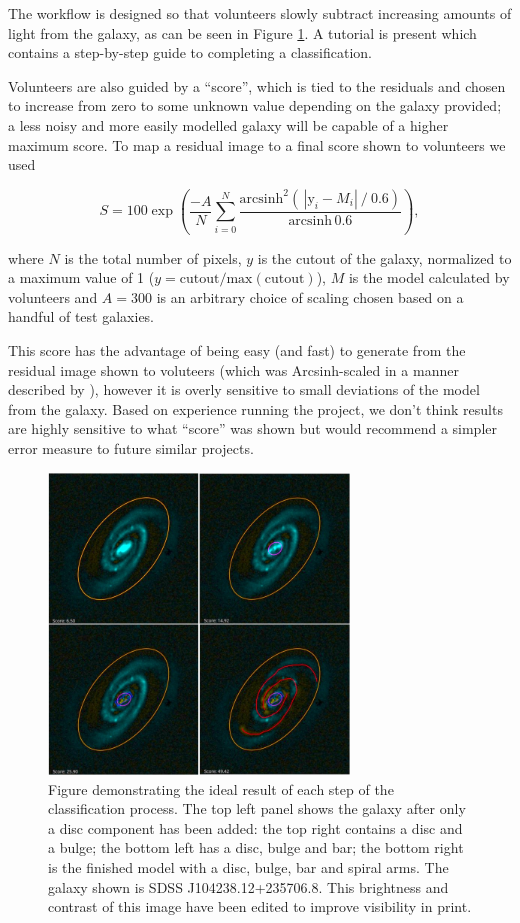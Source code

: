 \documentclass[../main.tex]{subfiles}
\begin{document}
The workflow is designed so that volunteers slowly subtract increasing amounts of light from the galaxy, as can be seen in Figure \ref{fig:residualsStepByStep}. A tutorial is present which contains a step-by-step guide to completing a classification.

Volunteers are also guided by a ``score'', which is tied to the residuals and chosen to increase from zero to some unknown value depending on the galaxy provided; a less noisy and more easily modelled galaxy will be capable of a higher maximum score. To map a residual image to a final score shown to volunteers we used

\begin{equation*}
    S = 100 \exp\left(\frac{-A}{N}\sum_{i=0}^N\frac{\text{arcsinh}^2\left(\,|\text{y}_i - M_i|\ /\ 0.6\right)}{\text{arcsinh}\,0.6 }\right),
\end{equation*}

where $N$ is the total number of pixels, $y$ is the cutout of the galaxy, normalized to a maximum value of 1 ($y = \text{cutout}/\text{max}(\text{cutout})$), $M$ is the model calculated by volunteers and $A=300$ is an arbitrary choice of scaling chosen based on a handful of test galaxies.

This score has the advantage of being easy (and fast) to generate from the residual image shown to voluteers (which was Arcsinh-scaled in a manner described by \citealt{Lupton2003:astro-ph/0312483v1}), however it is overly sensitive to small deviations of the model from the galaxy. Based on experience running the project, we don't think results are highly sensitive to what ``score'' was shown but would recommend a simpler error measure to future similar projects.

\begin{figure}
  \includegraphics[width=8cm]{images/residualProgress.jpg}
  \caption{Figure demonstrating the ideal result of each step of the classification process. The top left panel shows the galaxy after only a disc component has been added: the top right contains a disc and a bulge; the bottom left has a disc, bulge and bar; the bottom right is the finished model with a disc, bulge, bar and spiral arms. The galaxy shown is SDSS J104238.12+235706.8. This brightness and contrast of this image have been edited to improve visibility in print.}
  \label{fig:residualsStepByStep}
\end{figure}
\end{document}
